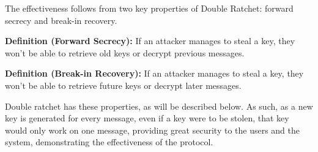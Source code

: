 The effectiveness follows from two key properties of Double Ratchet: 
forward secrecy and break-in recovery.

\textbf{Definition (Forward Secrecy):} If an attacker manages to steal a key, they won't be able to 
retrieve old keys or decrypt previous messages.

\textbf{Definition (Break-in Recovery):} If an attacker manages to steal a key, they won't be able to 
retrieve future keys or decrypt later messages.

Double ratchet has these properties, as will be described below. As such, as a new key is generated 
for every message, even if a key were to be stolen, that key would only work on one message, providing great 
security to the users and the system, demonstrating the effectiveness of the protocol.
